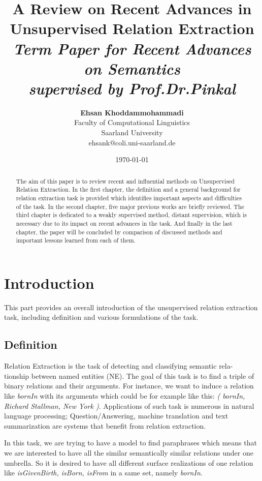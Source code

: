 \documentclass[12pt]{report}
\title{{\bf A Review on Recent Advances in Unsupervised Relation Extraction} \\
\it Term Paper for Recent Advances on Semantics \\ supervised by Prof.Dr.Pinkal}
\author{ {\bf Ehsan Khoddammohammadi}  \\
Faculty of Computational Linguistics \\
Saarland University\\
{\small ehsank@coli.uni-saarland.de}
}
\date{\today}
\begin{document}
\pagestyle{plain}
\maketitle

\pagebreak
\begin{abstract}

The aim of this paper is to review recent and influential methods on
Unsupervised Relation Extraction. In the first chapter, the definition and a general background
for relation extraction task is provided which identifies important aspects and
difficulties of the task. In the second chapter, five major previous works are
briefly reviewed. The third chapter is dedicated to a weakly supervised method, distant supervision, which is 
necessary due to its impact on recent advances in the task. And
finally in the last chapter, the paper will be concluded by comparison of discussed methods and important lessons learned from each of them.

\end{abstract}

\pagebreak
\tableofcontents
\pagebreak

\cleardoublepage
{}

\chapter{Introduction}
\label{ch:intro}

This part provides an overall introduction of the unsupervised relation extraction task, including
definition and various formulations of the task.

\section{Definition}
\label{ch:intro}

Relation Extraction is the task of detecting and classifying semantic rela-
tionship between named entities (NE). The goal of this task is to find a triple
of binary relations and their arguments. For instance, we want to induce a
relation like \emph{bornIn} with its arguments which could be for example like this:\emph{ (
bornIn, Richard Stallman, New York )}. Applications of such task is numerous
in natural language processing; Question/Answering, machine translation and
text summarization are systems that benefit from relation extraction.

In this task, we are trying to have a model to find paraphrases which means
that we are interested to have all the similar semantically similar relations under
one umbrella. So it is desired to have all different surface realizations of one
relation like \emph{isGivenBirth, isBorn, isFrom} in a same set, namely \emph{bornIn}.
\end{document}
